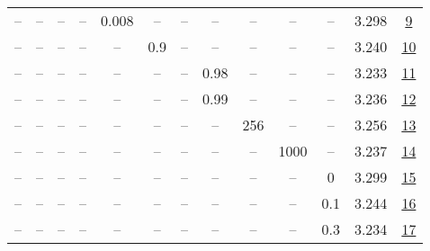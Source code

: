 \begin{table}[H]
\begin{tabular}{ccccccccccccc}
-- & -- & -- & -- & 0.008 & -- & -- & -- & -- & -- & -- & 3.298 & \href{https://wandb.ai/stanford-mercury/optimizer-scaling/runs/sweep-300m-6B-mudamg017773lr0.008-alr0.004-wd0.2-minlr0-warmup50-40d709}{9} \\
-- & -- & -- & -- & -- & 0.9 & -- & -- & -- & -- & -- & 3.240 & \href{https://wandb.ai/stanford-mercury/optimizer-scaling/runs/sweep-300m-6B-mudamga30215lr0.004-alr0.004-wd0.2-minlr0-warmup50-ab5a5b}{10} \\
-- & -- & -- & -- & -- & -- & -- & 0.98 & -- & -- & -- & 3.233 & \href{https://wandb.ai/stanford-mercury/optimizer-scaling/runs/sweep-300m-6B-mudamg51f0e2lr0.004-alr0.004-wd0.2-minlr0-warmup50-748111}{11} \\
-- & -- & -- & -- & -- & -- & -- & 0.99 & -- & -- & -- & 3.236 & \href{https://wandb.ai/stanford-mercury/optimizer-scaling/runs/sweep-300m-6B-mudamg5c78d9lr0.004-alr0.004-wd0.2-minlr0-warmup50-3d87f8}{12} \\
-- & -- & -- & -- & -- & -- & -- & -- & 256 & -- & -- & 3.256 & \href{https://wandb.ai/stanford-mercury/optimizer-scaling/runs/sweep-300m-6B-mudamg91d82flr0.004-alr0.004-wd0.2-minlr0-warmup50-28498c}{13} \\
-- & -- & -- & -- & -- & -- & -- & -- & -- & 1000 & -- & 3.237 & \href{https://wandb.ai/stanford-mercury/optimizer-scaling/runs/sweep-300m-6B-mudamg96a081lr0.004-alr0.004-wd0.2-minlr0-warmup10-95c3b8}{14} \\
-- & -- & -- & -- & -- & -- & -- & -- & -- & -- & 0 & 3.299 & \href{https://wandb.ai/stanford-mercury/optimizer-scaling/runs/sweep-300m-6B-mudamg2a5fa3lr0.004-alr0.004-wd0-minlr0-warmup500--690b1b}{15} \\
-- & -- & -- & -- & -- & -- & -- & -- & -- & -- & 0.1 & 3.244 & \href{https://wandb.ai/stanford-mercury/optimizer-scaling/runs/sweep-300m-6B-mudamg811746lr0.004-alr0.004-wd0.1-minlr0-warmup50-a26f3d}{16} \\
-- & -- & -- & -- & -- & -- & -- & -- & -- & -- & 0.3 & 3.234 & \href{https://wandb.ai/stanford-mercury/optimizer-scaling/runs/sweep-300m-6B-mudamg723c38lr0.004-alr0.004-wd0.3-minlr0-warmup50-372eee}{17} \\
\bottomrule
\end{tabular}
\end{table}


